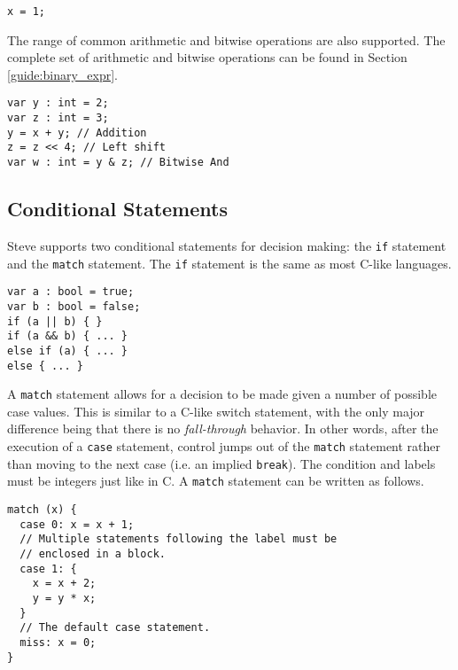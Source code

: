 \begin{codepage}
\begin{lstlisting}
x = 1;
\end{lstlisting}
\end{codepage}

The range of common arithmetic and bitwise operations are also supported. The 
complete set of arithmetic and bitwise operations can be found in Section
\ref{guide:binary_expr}.

\begin{codepage}
\begin{lstlisting}
var y : int = 2;
var z : int = 3;
y = x + y; // Addition
z = z << 4; // Left shift
var w : int = y & z; // Bitwise And
\end{lstlisting}
\end{codepage}

\subsection{Conditional Statements} \label{tut:condition}

Steve supports two conditional statements for decision making: the \texttt{if} statement and the \texttt{match} statement. The \texttt{if} statement is the same as most C-like languages.

\begin{codepage}
\begin{lstlisting}
var a : bool = true;
var b : bool = false;
if (a || b) { }
if (a && b) { ... }
else if (a) { ... }
else { ... }
\end{lstlisting}
\end{codepage}

A \texttt{match} statement allows for a decision to be made given a number of 
possible case values. 
This is similar to a C-like switch statement, with the only
major difference being that there is no \textit{fall-through} behavior. In other
words, after the execution of a \texttt{case} statement, control jumps out of the 
\texttt{match} statement rather than moving to the next case (i.e. an implied 
\texttt{break}). 
The condition and labels must be integers just like in C. 
A \texttt{match} statement can be written as follows.

\begin{codepage}
\begin{lstlisting}
match (x) {
  case 0: x = x + 1;
  // Multiple statements following the label must be
  // enclosed in a block.
  case 1: {
    x = x + 2;
    y = y * x;
  }
  // The default case statement.
  miss: x = 0;
}
\end{lstlisting}
\end{codepage}

